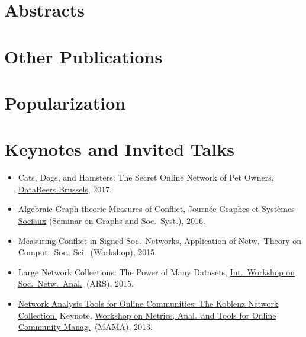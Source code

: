 \documentclass[line,mm]{res}
\newcounter{x}
\newcounter{y}
\newcommand{\talknumber}{T\arabic{y}\stepcounter{y}}
\begin{document}
\begin{resume}
\section{Abstracts}          
\section{Other Publications} 
\section{Popularization}     

\section{Keynotes and Invited Talks}
\begin{itemize}
\item[{[\talknumber]}]
  Cats, Dogs, and Hamsters:  The Secret Online Network of Pet Owners,
  \href{http://databeers.brussels/}{DataBeers Brussels}, 2017.   
\item[{[\talknumber]}] 
  \href{https://www.slideshare.net/kunegis/algebraic-graphtheoretic-measures-of-conflict}{Algebraic Graph-theoric Measures of Conflict}, 
  \href{http://jgss.sciencesconf.org/}{Journée Graphes et Systèmes
    Sociaux} (Seminar on Graphs and Soc.\ Syst.), 2016.  
\item[{[\talknumber]}] Measuring Conflict in Signed Soc.\ Networks, 
  Application of Netw.\ Theory on Comput.\ Soc.\ Sci.\ (Workshop), 2015.
\item[{[\talknumber]}] 
  Large Network Collections:  The Power of Many Datasets,
  \href{http://www.ars15.unisa.it/}{Int.\ Workshop on Soc.\ Netw.\ Anal.}\ (ARS), 2015. 
\item[{[\talknumber]}] 
  \href{https://github.com/kunegis/pdfs/blob/master/kunegis:konect-mama.presentation.pdf}{Network
    Analysis Tools for Online Communities: The Koblenz Network 
    Collection.} Keynote, \href{http://mama.west.uni-koblenz.de/}{Workshop
    on Metrics, Anal.\ and Tools for Online Community Manag.}\ (MAMA), 2013.  
\end{itemize}


\end{resume}
\end{document}
